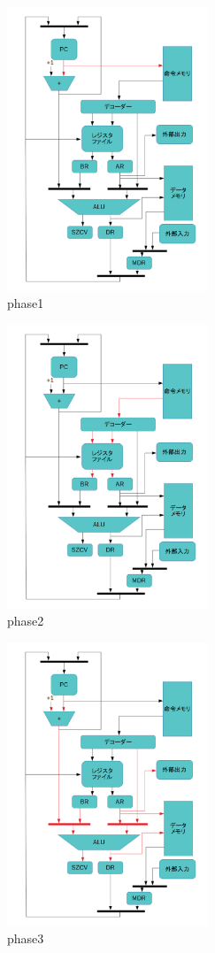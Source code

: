 \documentclass{jsreport}
\begin{document}
\begin{figure}[h]
\centering
\includegraphics[width=60mm]{figures/phase1.png}
\caption{phase1}
\label{fig:phase1}
\end{figure}
\begin{figure}[h]
\centering
\includegraphics[width=60mm]{figures/phase2.png}
\caption{phase2}
\label{fig:phase2}
\end{figure}
\begin{figure}[h]
\centering
\includegraphics[width=60mm]{figures/phase3.png}
\caption{phase3}
\label{fig:phase3}
\end{figure}
\end{document}
